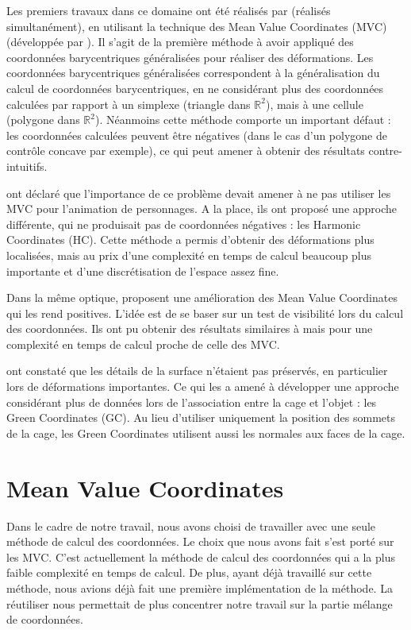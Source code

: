 Les premiers travaux dans ce domaine ont été réalisés par \cite{JSW05}
\cite{FKR05} (réalisés simultanément), en utilisant la technique des
Mean Value Coordinates (MVC) (développée par \cite{Flo03}). Il s'agit de la
première méthode à avoir appliqué des coordonnées barycentriques généralisées
pour réaliser des déformations. Les coordonnées barycentriques généralisées
correspondent à la généralisation du calcul de coordonnées barycentriques, en ne
considérant plus des coordonnées calculées par rapport à un simplexe (triangle
dans $\mathbb{R}^2$), mais à une cellule (polygone dans $\mathbb{R}^2$).
Néanmoins cette méthode comporte un important défaut : les coordonnées calculées
peuvent être négatives (dans le cas d'un polygone de contrôle concave par
exemple), ce qui peut amener à obtenir des résultats contre-intuitifs.

\cite{JMDGS07} ont déclaré que l'importance de ce problème devait amener à ne
pas utiliser les MVC pour l'animation de personnages. A la place, ils ont
proposé une approche différente, qui ne produisait pas de coordonnées négatives
: les Harmonic Coordinates (HC). Cette méthode a permis d'obtenir des
déformations plus localisées, mais au prix d'une complexité en temps de calcul
beaucoup plus importante et d'une discrétisation de l'espace assez fine.

Dans la même optique, \cite{LKCL07} proposent une amélioration des Mean Value
Coordinates qui les rend positives. L'idée est de se baser sur un test de
visibilité lors du calcul des coordonnées. Ils ont pu obtenir des résultats
similaires à \cite{JMDGS07} mais pour une complexité en temps de calcul proche
de celle des MVC.

\cite{LLC08} ont constaté que les détails de la surface n'étaient pas préservés,
en particulier lors de déformations importantes. Ce qui les a amené à développer
une approche considérant plus de données lors de l'association entre la cage et
l'objet : les Green Coordinates (GC). Au lieu d'utiliser uniquement la position
des sommets de la cage, les Green Coordinates utilisent aussi les normales aux
faces de la cage.

\section{Mean Value Coordinates}

Dans le cadre de notre travail, nous avons choisi de travailler avec une seule
méthode de calcul des coordonnées. Le choix que nous avons fait s'est porté sur
les MVC. C'est actuellement la méthode de calcul des coordonnées qui a la plus
faible complexité en temps de calcul. De plus, ayant déjà travaillé sur cette
méthode, nous avions déjà fait une première implémentation de la méthode. La
réutiliser nous permettait de plus concentrer notre travail sur la partie
mélange de coordonnées.

